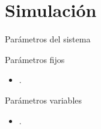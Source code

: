 \section{Simulación}\label{sec:simulacion}
\begin{frame}{Parámetros del sistema}
    \begin{block}{Parámetros fijos}
        \begin{itemize}
            \item .
        \end{itemize}
    \end{block}
    \begin{block}{Parámetros variables}
        \begin{itemize}
            \item .
        \end{itemize}
    \end{block}
\end{frame}

